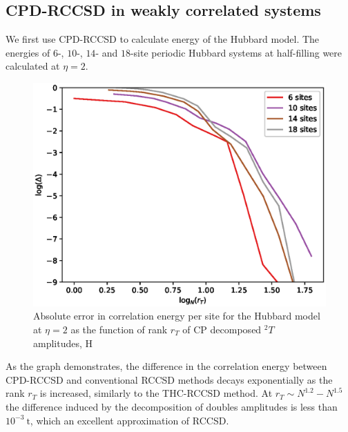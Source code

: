 \subsection{CPD-RCCSD in weakly correlated systems}
We first use CPD-RCCSD to calculate energy of the Hubbard model.
The energies of $6$-, $10$-, $14$- and $18$-site periodic Hubbard systems at 
half-filling were calculated at $\eta = 2$.
%
\begin{figure}[!tb]
\includegraphics[width=\columnwidth]{figures/cpd_rccsd/err_vs_r_u_2_cpd}
\caption{Absolute error in correlation energy per site for the 
Hubbard model at $\eta = 2$ as the function of rank $r_{T}$ of CP decomposed
${}^2T$ amplitudes, H
\label{fig:err_vs_r_u_2}}
\end{figure}
%
As the graph demonstrates, the difference in the correlation energy 
between CPD-RCCSD and conventional RCCSD methods decays exponentially as the 
rank $r_{T}$ is increased, similarly to the THC-RCCSD method. At  
$r_{T} \sim N^{1.2} - N^{1.5}$ the difference induced by the decomposition 
of doubles amplitudes is less than $10^{-3}~\mathrm{t}$, which an excellent 
approximation of RCCSD. 

